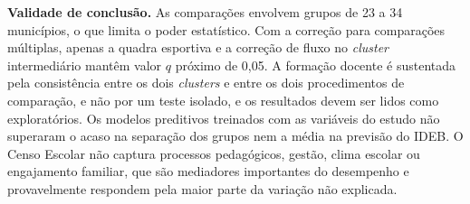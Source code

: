 \textbf{Validade de conclusão.} As comparações envolvem grupos de 23 a 34 municípios, o que limita o poder estatístico. Com a correção para comparações múltiplas, apenas a quadra esportiva e a correção de fluxo no \textit{cluster} intermediário mantêm valor $q$ próximo de 0,05. A formação docente é sustentada pela consistência entre os dois \textit{clusters} e entre os dois procedimentos de comparação, e não por um teste isolado, e os resultados devem ser lidos como exploratórios. Os modelos preditivos treinados com as variáveis do estudo não superaram o acaso na separação dos grupos nem a média na previsão do IDEB. O Censo Escolar não captura processos pedagógicos, gestão, clima escolar ou engajamento familiar, que são mediadores importantes do desempenho e provavelmente respondem pela maior parte da variação não explicada.
